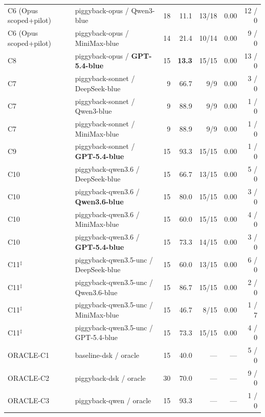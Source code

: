 \documentclass[journal,twocolumn,10pt]{IEEEtran}
\begin{document}
\begin{table}[tb]
\begin{tabular}{@{}llrrrrr@{}}
C6 (Opus scoped+pilot) & piggyback-opus / Qwen3-blue        & 18 & 11.1 & 13/18 & 0.00 & 12 / 0 \\
C6 (Opus scoped+pilot) & piggyback-opus / MiniMax-blue      & 14 & 21.4 & 10/14 & 0.00 &  9 / 0 \\
C8        & piggyback-opus / \textbf{GPT-5.4-blue}      & 15 & \textbf{13.3} & 15/15 & 0.00 & 13 / 0 \\
C7        & piggyback-sonnet / DeepSeek-blue            &  9 & 66.7 &  9/9  & 0.00 &  3 / 0 \\
C7        & piggyback-sonnet / Qwen3-blue               &  9 & 88.9 &  9/9  & 0.00 &  1 / 0 \\
C7        & piggyback-sonnet / MiniMax-blue             &  9 & 88.9 &  9/9  & 0.00 &  1 / 0 \\
C9        & piggyback-sonnet / \textbf{GPT-5.4-blue}    & 15 & 93.3 & 15/15 & 0.00 &  1 / 0 \\
C10       & piggyback-qwen3.6 / DeepSeek-blue           & 15 & 66.7 & 13/15 & 0.00 &  5 / 0 \\
C10       & piggyback-qwen3.6 / \textbf{Qwen3.6-blue}   & 15 & 80.0 & 15/15 & 0.00 &  3 / 0 \\
C10       & piggyback-qwen3.6 / MiniMax-blue            & 15 & 60.0 & 15/15 & 0.00 &  4 / 0 \\
C10       & piggyback-qwen3.6 / \textbf{GPT-5.4-blue}   & 15 & 73.3 & 14/15 & 0.00 &  3 / 0 \\
C11$^{\ddagger}$ & piggyback-qwen3.5-unc / DeepSeek-blue     & 15 & 60.0 & 13/15 & 0.00 &  6 / 0 \\
C11$^{\ddagger}$ & piggyback-qwen3.5-unc / Qwen3.6-blue      & 15 & 86.7 & 15/15 & 0.00 &  2 / 0 \\
C11$^{\ddagger}$ & piggyback-qwen3.5-unc / MiniMax-blue      & 15 & 46.7 &  8/15 & 0.00 &  1 / 7 \\
C11$^{\ddagger}$ & piggyback-qwen3.5-unc / GPT-5.4-blue      & 15 & 73.3 & 15/15 & 0.00 &  4 / 0 \\
\midrule
ORACLE-C1 & baseline-dsk / oracle              & 15 &  40.0 & ---   & ---  &  5 / 0 \\
ORACLE-C2 & piggyback-dsk / oracle             & 30 &  70.0 & ---   & ---  &  9 / 0 \\
ORACLE-C3 & piggyback-qwen / oracle            & 15 &  93.3 & ---   & ---  &  1 / 0 \\
\bottomrule
\end{tabular}
\end{table}
\end{document}
